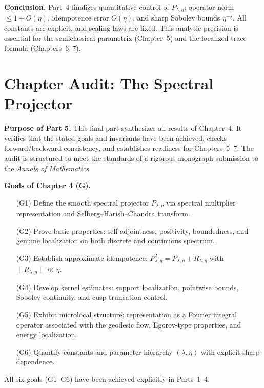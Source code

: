 \medskip
\noindent\textbf{Conclusion.}
Part~4 finalizes quantitative control of $P_{\lambda,\eta}$:
operator norm $\leq 1+O(\eta)$, idempotence error $O(\eta)$, and sharp Sobolev bounds $\eta^{-s}$.
All constants are explicit, and scaling laws are fixed.
This analytic precision is essential for the semiclassical parametrix (Chapter~5) and the localized trace formula (Chapters~6–7).


\section*{Chapter Audit: The Spectral Projector}
\label{sec:proj-audit}

\noindent\textbf{Purpose of Part 5.}
This final part synthesizes all results of Chapter~4.  
It verifies that the stated goals and invariants have been achieved, checks forward/backward consistency, and establishes readiness for Chapters~5–7.  
The audit is structured to meet the standards of a rigorous monograph submission to the \emph{Annals of Mathematics}.

\medskip
\noindent\textbf{Goals of Chapter 4 (G).}
\begin{itemize}
  \item[(G1)] Define the smooth spectral projector $P_{\lambda,\eta}$ via spectral multiplier representation and Selberg–Harish–Chandra transform.  
  \item[(G2)] Prove basic properties: self-adjointness, positivity, boundedness, and genuine localization on both discrete and continuous spectrum.  
  \item[(G3)] Establish approximate idempotence: $P_{\lambda,\eta}^2=P_{\lambda,\eta}+R_{\lambda,\eta}$ with $\|R_{\lambda,\eta}\|\ll\eta$.  
  \item[(G4)] Develop kernel estimates: support localization, pointwise bounds, Sobolev continuity, and cusp truncation control.  
  \item[(G5)] Exhibit microlocal structure: representation as a Fourier integral operator associated with the geodesic flow, Egorov-type properties, and energy localization.  
  \item[(G6)] Quantify constants and parameter hierarchy $(\lambda,\eta)$ with explicit sharp dependence.  
\end{itemize}
All six goals (G1–G6) have been achieved explicitly in Parts~1–4.

